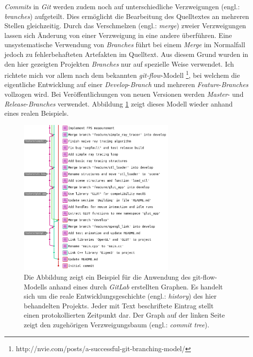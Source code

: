 \documentclass[crop=false]{standalone}
\begin{document}
    \textit{Commits} in \textit{Git} werden zudem noch auf unterschiedliche Verzweigungen (engl.: \textit{branches}) aufgeteilt.
    Dies ermöglicht die Bearbeitung des Quelltextes an mehreren Stellen gleichzeitig.
    Durch das Verschmelzen (engl.: \textit{merge}) zweier Verzweigungen lassen sich Änderung von einer Verzweigung in eine andere überführen.
    Eine unsystematische Verwendung von \textit{Branches} führt bei einem \textit{Merge} im Normalfall jedoch zu fehlerbehafteten Artefakten im Quelltext.
    Aus diesem Grund wurden in den hier gezeigten Projekten \textit{Branches} nur auf spezielle Weise verwendet.
    Ich richtete mich vor allem nach dem bekannten \textit{git-flow}-Modell%
    \footnote{http://nvie.com/posts/a-successful-git-branching-model/}, %
    bei welchem die eigentliche Entwicklung auf einer \textit{Develop}-\textit{Branch} und mehreren \textit{Feature}-\textit{Branches} vollzogen wird.
    Bei Veröffentlichungen von neuen Versionen werden \textit{Master}- und \textit{Release}-\textit{Branches} verwendet.
    Abbildung \ref{fig:git-flow-example} zeigt dieses Modell wieder anhand eines realen Beispiels.
    \begin{figure}[h]
      \center
      \includegraphics[width=0.7\textwidth]{images/git_flow_example.png}
      \caption{%
        Die Abbildung zeigt ein Beispiel für die Anwendung des git-flow-Modells anhand eines durch \textit{GitLab} erstellten Graphen.
        Es handelt sich um die reale Entwicklungsgeschichte (engl.: \textit{history}) des hier behandelten Projekts.
        Jeder mit Text beschriftete Eintrag stellt einen protokollierten Zeitpunkt dar.
        Der Graph auf der linken Seite zeigt den zugehörigen Verzweigungsbaum (engl.: \textit{commit tree}).
      }
      \label{fig:git-flow-example}
    \end{figure}
\end{document}
